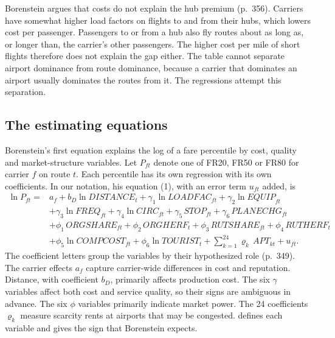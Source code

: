 Borenstein argues that costs do not explain the hub premium (p.~356). Carriers have somewhat higher load
factors on flights to and from their hubs, which lowers cost per passenger. Passengers to or from a hub also
fly routes about as long as, or longer than, the carrier's other passengers. The higher cost per mile of short
flights therefore does not explain the gap either. The table cannot separate airport dominance from route
dominance, because a carrier that dominates an airport usually dominates the routes from it. The regressions
attempt this separation.

\subsection{The estimating equations}\label{sec:09-bor-equations}

 Borenstein's first equation explains the log of a fare percentile by cost,
quality and market-structure variables. Let $P_{ft}$ denote one of FR20, FR50 or FR80 for carrier $f$ on route
$t$. Each percentile has its own regression with its own coefficients. In our notation, his equation (1), with
an error term $u_{ft}$ added, is
\begin{equation}\label{eq:09-bor-price}
\begin{aligned}
\ln P_{ft} = {} & a_f + b_D \ln \mathit{DISTANCE}_t + \gamma_1 \ln \mathit{LOADFAC}_{ft}
  + \gamma_2 \ln \mathit{EQUIP}_{ft} \\
& + \gamma_3 \ln \mathit{FREQ}_{ft} + \gamma_4 \ln \mathit{CIRC}_{ft} + \gamma_5\, \mathit{STOP}_{ft}
  + \gamma_6\, \mathit{PLANECHG}_{ft} \\
& + \phi_1\, \mathit{ORGSHARE}_{ft} + \phi_2\, \mathit{ORGHERF}_t + \phi_3\, \mathit{RUTSHARE}_{ft}
  + \phi_4\, \mathit{RUTHERF}_t \\
& + \phi_5 \ln \mathit{COMPCOST}_{ft} + \phi_6 \ln \mathit{TOURIST}_t
  + \sum_{k=1}^{24} \varrho_k\, \mathit{APT}_{kt} + u_{ft} .
\end{aligned}
\end{equation}
The coefficient letters group the variables by their hypothesized role (p.~349). The carrier effects $a_f$
capture carrier-wide differences in cost and reputation. Distance, with coefficient $b_D$, primarily affects
production cost. The six $\gamma$ variables affect both cost and service quality, so their signs are ambiguous
in advance. The six $\phi$ variables primarily indicate market power. The 24 coefficients $\varrho_k$ measure
scarcity rents at airports that may be congested.  defines each variable and gives the
sign that Borenstein expects.

